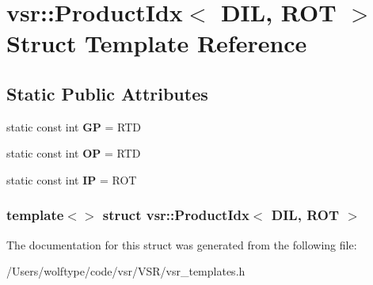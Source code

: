 \hypertarget{structvsr_1_1_product_idx_3_01_d_i_l_00_01_r_o_t_01_4}{\section{vsr\-:\-:Product\-Idx$<$ D\-I\-L, R\-O\-T $>$ Struct Template Reference}
\label{structvsr_1_1_product_idx_3_01_d_i_l_00_01_r_o_t_01_4}
}
\subsection*{Static Public Attributes}
\begin{DoxyCompactItemize}
\item 
\hypertarget{structvsr_1_1_product_idx_3_01_d_i_l_00_01_r_o_t_01_4_aca1b54d189bf34919e109d7373740e9a}{static const int {\bfseries G\-P} = R\-T\-D}\label{structvsr_1_1_product_idx_3_01_d_i_l_00_01_r_o_t_01_4_aca1b54d189bf34919e109d7373740e9a}

\item 
\hypertarget{structvsr_1_1_product_idx_3_01_d_i_l_00_01_r_o_t_01_4_ab0a266badbb851d2ac49b41204375086}{static const int {\bfseries O\-P} = R\-T\-D}\label{structvsr_1_1_product_idx_3_01_d_i_l_00_01_r_o_t_01_4_ab0a266badbb851d2ac49b41204375086}

\item 
\hypertarget{structvsr_1_1_product_idx_3_01_d_i_l_00_01_r_o_t_01_4_ab3435766ffeb1ad4242c00d6225f7c33}{static const int {\bfseries I\-P} = R\-O\-T}\label{structvsr_1_1_product_idx_3_01_d_i_l_00_01_r_o_t_01_4_ab3435766ffeb1ad4242c00d6225f7c33}

\end{DoxyCompactItemize}
\subsubsection*{template$<$$>$ struct vsr\-::\-Product\-Idx$<$ D\-I\-L, R\-O\-T $>$}



The documentation for this struct was generated from the following file\-:\begin{DoxyCompactItemize}
\item 
/\-Users/wolftype/code/vsr/\-V\-S\-R/vsr\-\_\-templates.\-h\end{DoxyCompactItemize}
